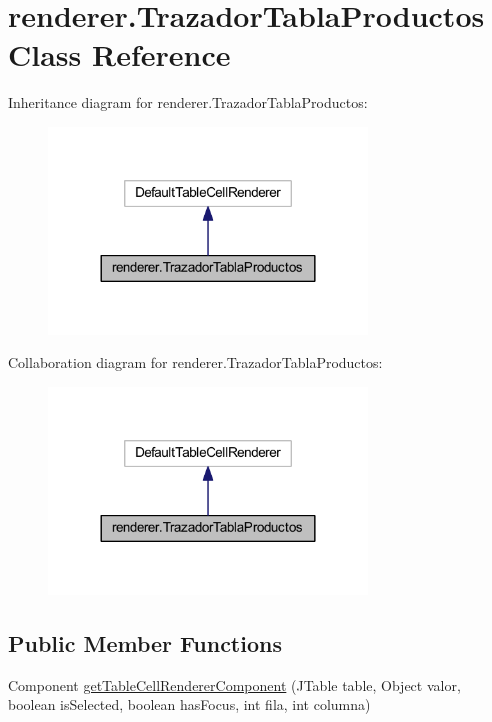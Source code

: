 \hypertarget{classrenderer_1_1_trazador_tabla_productos}{}\section{renderer.\+Trazador\+Tabla\+Productos Class Reference}
\label{classrenderer_1_1_trazador_tabla_productos}


Inheritance diagram for renderer.\+Trazador\+Tabla\+Productos\+:
\nopagebreak
\begin{figure}[H]
\begin{center}
\leavevmode
\includegraphics[width=240pt]{classrenderer_1_1_trazador_tabla_productos__inherit__graph}
\end{center}
\end{figure}


Collaboration diagram for renderer.\+Trazador\+Tabla\+Productos\+:
\nopagebreak
\begin{figure}[H]
\begin{center}
\leavevmode
\includegraphics[width=240pt]{classrenderer_1_1_trazador_tabla_productos__coll__graph}
\end{center}
\end{figure}
\subsection*{Public Member Functions}
\begin{DoxyCompactItemize}
\item 
Component \mbox{\hyperlink{classrenderer_1_1_trazador_tabla_productos_a0d15ae9262431f81b66258d7f445092c}{get\+Table\+Cell\+Renderer\+Component}} (J\+Table table, Object valor, boolean is\+Selected, boolean has\+Focus, int fila, int columna)
\end{DoxyCompactItemize}


